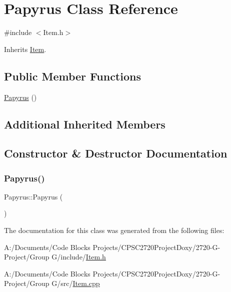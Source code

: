 \hypertarget{class_papyrus}{}\section{Papyrus Class Reference}
\label{class_papyrus}


{\ttfamily \#include $<$Item.\+h$>$}



Inherits \mbox{\hyperlink{class_item}{Item}}.

\subsection*{Public Member Functions}
\begin{DoxyCompactItemize}
\item 
\mbox{\hyperlink{class_papyrus_a2e974496faf8f8149aa2dfca98c29bb1}{Papyrus}} ()
\end{DoxyCompactItemize}
\subsection*{Additional Inherited Members}


\subsection{Constructor \& Destructor Documentation}
\mbox{\label{class_papyrus_a2e974496faf8f8149aa2dfca98c29bb1}} 
\subsubsection{\texorpdfstring{Papyrus()}{Papyrus()}}
{\footnotesize\ttfamily Papyrus\+::\+Papyrus (\begin{DoxyParamCaption}{ }\end{DoxyParamCaption})}



The documentation for this class was generated from the following files\+:\begin{DoxyCompactItemize}
\item 
A\+:/\+Documents/\+Code Blocks Projects/\+C\+P\+S\+C2720\+Project\+Doxy/2720-\/\+G-\/\+Project/\+Group G/include/\mbox{\hyperlink{_item_8h}{Item.\+h}}\item 
A\+:/\+Documents/\+Code Blocks Projects/\+C\+P\+S\+C2720\+Project\+Doxy/2720-\/\+G-\/\+Project/\+Group G/src/\mbox{\hyperlink{_item_8cpp}{Item.\+cpp}}\end{DoxyCompactItemize}

